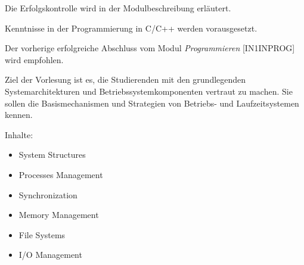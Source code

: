 \begin{course}

\setdoclanguagegerman
{}



\coursehead


\label{cour_6215.dp_997}


\begin{styleenv}
\begin{assessment}
Die Erfolgskontrolle wird in der Modulbeschreibung erläutert.


\end{assessment}

\begin{conditions}Kenntnisse in der Programmierung in C/C++ werden vorausgesetzt.

\end{conditions}

\begin{recommendations}Der vorherige erfolgreiche Abschluss vom Modul \emph{Programmieren} [IN1INPROG] wird empfohlen.

\end{recommendations}
\end{styleenv}

\begin{learningoutcomes}
Ziel der Vorlesung ist es, die Studierenden mit den grundlegenden Systemarchitekturen und Betriebssystemkomponenten vertraut zu machen. Sie sollen die Basismechanismen und Strategien von Betriebs- und Laufzeitsystemen kennen.


\end{learningoutcomes}

\begin{content}
Inhalte:

 \begin{itemize}\item System Structures  \item Processes Management  \item Synchronization  \item Memory Management  \item File Systems  \item I/O Management  \end{itemize}
\end{content}


\end{course}
